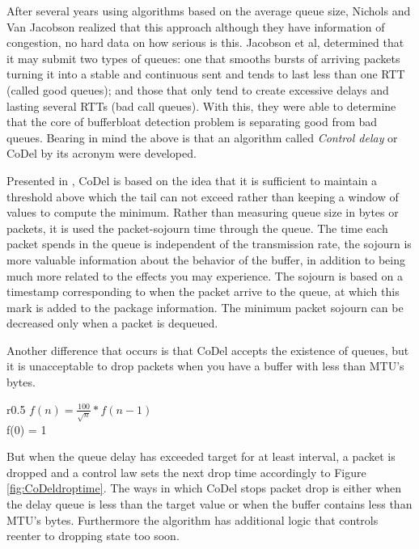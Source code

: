 After several years using algorithms based on the average queue size, Nichols
and Van Jacobson realized that this approach although they have information of
congestion, no hard data on how serious is this. Jacobson et al, determined
that it may submit two types of queues: one that smooths bursts of arriving
packets turning it into a stable and continuous sent and tends to last less
than one RTT (called good queues); and those that only tend to create
excessive delays and lasting several RTTs (bad call queues). With this, they
were able to determine that the core of bufferbloat detection problem is
separating good from bad queues. Bearing in mind the above is that an
algorithm called \textit{Control delay} or CoDel by its acronym were
developed.

Presented in \cite{NicholsJacobsonCQD}, CoDel is based on the idea that it is
sufficient to maintain a threshold above which the tail can not exceed rather
than keeping a window of values to compute the minimum. Rather than measuring
queue size in bytes or packets, it is used the packet-sojourn time through the
queue. The time each packet spends in the queue is independent of the
transmission rate, the \gls{sojourn} is more valuable information about the behavior
of the buffer, in addition to being much more related to the effects you may
experience. The sojourn is based on a timestamp corresponding to when the
packet arrive to the queue, at which this mark is added to the package
information. The minimum packet sojourn can be decreased only when a packet is
dequeued.

Another difference that occurs is that CoDel accepts the existence of queues,
but it is unacceptable to drop packets when you have a buffer with less than
\gls{MTU}'s bytes.

\begin{wrapfigure}{r}{0.5\textwidth}
    \centering
	$f(n) = \frac{100}{\sqrt{n}}*f(n-1)$ \\
	f(0) = 1
    \caption[CoDel droptime interval]{CoDel droptime interval, n=iteration}
    \label{fig:CoDeldroptime}
\end{wrapfigure}

But when the queue delay has exceeded target for at least interval, a packet
is dropped and a control law sets the next drop time accordingly to Figure
\ref{fig:CoDeldroptime}. The ways in which CoDel stops packet drop is either
when the delay queue is less than the target value or when the buffer contains
less than MTU's bytes. Furthermore the algorithm has additional logic that
controls reenter to dropping state too soon.


